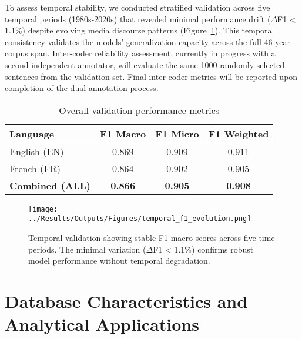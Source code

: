 \documentclass[12pt]{article}
\begin{document}
To assess temporal stability, we conducted stratified validation across five temporal periods (1980s-2020s) that revealed minimal performance drift ($\Delta$F1 < 1.1\%) despite evolving media discourse patterns (Figure~\ref{fig:temporal_validation}). This temporal consistency validates the models' generalization capacity across the full 46-year corpus span. Inter-coder reliability assessment, currently in progress with a second independent annotator, will evaluate the same 1000 randomly selected sentences from the validation set. Final inter-coder metrics will be reported upon completion of the dual-annotation process.


\begin{table}[h!]
\centering
\caption{Overall validation performance metrics}
\label{tab:final_validation_metrics}
\begin{tabular}{lccc}
\toprule
\textbf{Language} & \textbf{F1 Macro} & \textbf{F1 Micro} & \textbf{F1 Weighted} \\
\midrule
English (EN) & 0.869 & 0.909 & 0.911 \\
French (FR) & 0.864 & 0.902 & 0.905 \\
\midrule
\textbf{Combined (ALL)} & \textbf{0.866} & \textbf{0.905} & \textbf{0.908} \\
\bottomrule
\end{tabular}
\end{table}

\begin{figure}[h!]
\centering
\texttt{[image: ../Results/Outputs/Figures/temporal\_f1\_evolution.png]}
\caption{Temporal validation showing stable F1 macro scores across five time periods. The minimal variation ($\Delta$F1 < 1.1\%) confirms robust model performance without temporal degradation.}
\label{fig:temporal_validation}
\end{figure}

\clearpage
\section{Database Characteristics and Analytical Applications}
\end{document}
